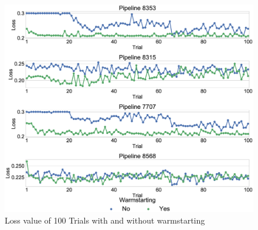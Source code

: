 \begin{figure}
\centering
\includegraphics[width=\columnwidth]{../images/experiment-results/task31-cold-warm-trials.eps}
\caption{Loss value of 100 Trials with and without warmstarting}
\label{fig-avg-warm-vs-cold-task-31}
\end{figure}

